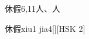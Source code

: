 \begin{entry}{休假}{6,11}{⼈、⼈}
  \begin{phonetics}{休假}{xiu1 jia4}[][HSK 2]
  \end{phonetics}
\end{entry}
